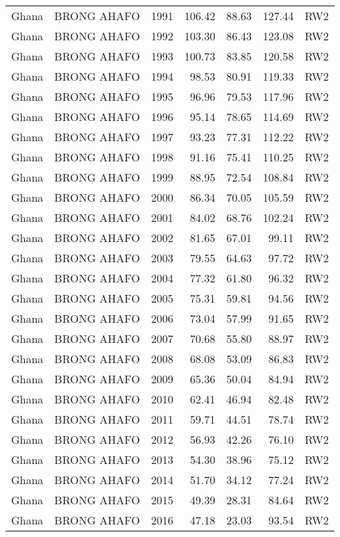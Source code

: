\begin{longtable}{lllrrrl}
  Ghana & BRONG AHAFO & 1991 & 106.42 & 88.63 & 127.44 & RW2 \\ 
  Ghana & BRONG AHAFO & 1992 & 103.30 & 86.43 & 123.08 & RW2 \\ 
  Ghana & BRONG AHAFO & 1993 & 100.73 & 83.85 & 120.58 & RW2 \\ 
  Ghana & BRONG AHAFO & 1994 & 98.53 & 80.91 & 119.33 & RW2 \\ 
  Ghana & BRONG AHAFO & 1995 & 96.96 & 79.53 & 117.96 & RW2 \\ 
  Ghana & BRONG AHAFO & 1996 & 95.14 & 78.65 & 114.69 & RW2 \\ 
  Ghana & BRONG AHAFO & 1997 & 93.23 & 77.31 & 112.22 & RW2 \\ 
  Ghana & BRONG AHAFO & 1998 & 91.16 & 75.41 & 110.25 & RW2 \\ 
  Ghana & BRONG AHAFO & 1999 & 88.95 & 72.54 & 108.84 & RW2 \\ 
  Ghana & BRONG AHAFO & 2000 & 86.34 & 70.05 & 105.59 & RW2 \\ 
  Ghana & BRONG AHAFO & 2001 & 84.02 & 68.76 & 102.24 & RW2 \\ 
  Ghana & BRONG AHAFO & 2002 & 81.65 & 67.01 & 99.11 & RW2 \\ 
  Ghana & BRONG AHAFO & 2003 & 79.55 & 64.63 & 97.72 & RW2 \\ 
  Ghana & BRONG AHAFO & 2004 & 77.32 & 61.80 & 96.32 & RW2 \\ 
  Ghana & BRONG AHAFO & 2005 & 75.31 & 59.81 & 94.56 & RW2 \\ 
  Ghana & BRONG AHAFO & 2006 & 73.04 & 57.99 & 91.65 & RW2 \\ 
  Ghana & BRONG AHAFO & 2007 & 70.68 & 55.80 & 88.97 & RW2 \\ 
  Ghana & BRONG AHAFO & 2008 & 68.08 & 53.09 & 86.83 & RW2 \\ 
  Ghana & BRONG AHAFO & 2009 & 65.36 & 50.04 & 84.94 & RW2 \\ 
  Ghana & BRONG AHAFO & 2010 & 62.41 & 46.94 & 82.48 & RW2 \\ 
  Ghana & BRONG AHAFO & 2011 & 59.71 & 44.51 & 78.74 & RW2 \\ 
  Ghana & BRONG AHAFO & 2012 & 56.93 & 42.26 & 76.10 & RW2 \\ 
  Ghana & BRONG AHAFO & 2013 & 54.30 & 38.96 & 75.12 & RW2 \\ 
  Ghana & BRONG AHAFO & 2014 & 51.70 & 34.12 & 77.24 & RW2 \\ 
  Ghana & BRONG AHAFO & 2015 & 49.39 & 28.31 & 84.64 & RW2 \\ 
  Ghana & BRONG AHAFO & 2016 & 47.18 & 23.03 & 93.54 & RW2 \\ 

\end{longtable}
